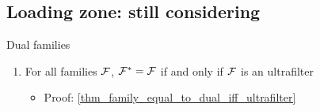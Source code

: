\subsection{Loading zone: still considering}


Dual families
\begin{enumerate}
    \item For all families $\mathcal{F}$, $\mathcal{F}^* = \mathcal{F}$ if and only if $\mathcal{F}$ is an ultrafilter
    \begin{itemize}
        \item Proof: \cref{thm_family_equal_to_dual_iff_ultrafilter}
    \end{itemize}
\end{enumerate}

